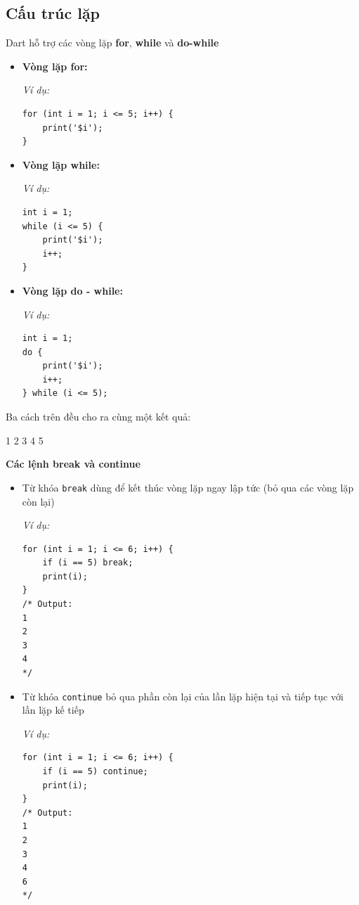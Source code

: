 \documentclass[../DoAn.tex]{subfiles}
\numberwithin{figure}{chapter}
\begin{document}
\subsection{Cấu trúc lặp}
Dart hỗ trợ các vòng lặp \textbf{for}, \textbf{while} và \textbf{do-while}
\begin{itemize}
\item \textbf{Vòng lặp for:} 

\textit{Ví dụ:} 

\begin{lstlisting}
for (int i = 1; i <= 5; i++) {
    print('$i'); 
}
\end{lstlisting}

\item \textbf{Vòng lặp while:} 

\textit{Ví dụ:} 
\begin{lstlisting}
int i = 1;
while (i <= 5) {
    print('$i');
    i++;
}
\end{lstlisting}

\item \textbf{Vòng lặp do - while:} 

\textit{Ví dụ:} 
\begin{lstlisting}
int i = 1;
do {
    print('$i'); 
    i++; 
} while (i <= 5);
\end{lstlisting}
\end{itemize}

Ba cách trên đều cho ra cùng một kết quả:
\begin{myverbatim}
1
2
3
4
5
\end{myverbatim}

\textbf{Các lệnh break và continue} 
\begin{itemize}
\item Từ khóa \texttt{break} dùng để kết thúc vòng lặp ngay lập tức (bỏ qua các vòng lặp còn lại)

\textit{Ví dụ:}
\begin{lstlisting}
for (int i = 1; i <= 6; i++) { 
    if (i == 5) break; 
    print(i); 
} 
/* Output:
1
2
3
4
*/
\end{lstlisting}

\item Từ khóa \texttt{continue} bỏ qua phần còn lại của lần lặp hiện tại và tiếp tục với lần lặp kế tiếp 

\textit{Ví dụ:}
\begin{lstlisting}
for (int i = 1; i <= 6; i++) { 
    if (i == 5) continue; 
    print(i); 
} 
/* Output:
1
2
3
4
6
*/
\end{lstlisting}
\end{itemize}
\end{document}
